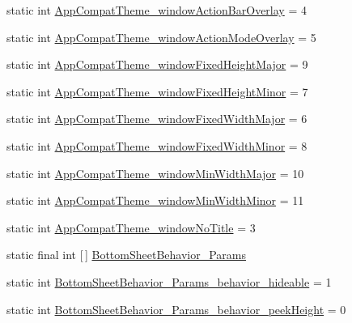 \begin{DoxyCompactItemize}
\item 
static int \hyperlink{classandroid_1_1support_1_1v7_1_1mediarouter_1_1R_1_1styleable_a3ed10a138c0c8928988e19b890aec7f7}{App\+Compat\+Theme\+\_\+window\+Action\+Bar\+Overlay} = 4
\item 
static int \hyperlink{classandroid_1_1support_1_1v7_1_1mediarouter_1_1R_1_1styleable_ae55a9de1cb75512d04d62f878dcfefc3}{App\+Compat\+Theme\+\_\+window\+Action\+Mode\+Overlay} = 5
\item 
static int \hyperlink{classandroid_1_1support_1_1v7_1_1mediarouter_1_1R_1_1styleable_a7f07a96e9dd77caa12d1744db19f037d}{App\+Compat\+Theme\+\_\+window\+Fixed\+Height\+Major} = 9
\item 
static int \hyperlink{classandroid_1_1support_1_1v7_1_1mediarouter_1_1R_1_1styleable_a9d793fbf38eeb7d1b8c2707b951dcf24}{App\+Compat\+Theme\+\_\+window\+Fixed\+Height\+Minor} = 7
\item 
static int \hyperlink{classandroid_1_1support_1_1v7_1_1mediarouter_1_1R_1_1styleable_a2a286949ebf9182579df1a88e8e294d0}{App\+Compat\+Theme\+\_\+window\+Fixed\+Width\+Major} = 6
\item 
static int \hyperlink{classandroid_1_1support_1_1v7_1_1mediarouter_1_1R_1_1styleable_a291edfbcc421e452ee7b5b1b806fdd68}{App\+Compat\+Theme\+\_\+window\+Fixed\+Width\+Minor} = 8
\item 
static int \hyperlink{classandroid_1_1support_1_1v7_1_1mediarouter_1_1R_1_1styleable_ac2a09f6509c071955e5978f37e5c4633}{App\+Compat\+Theme\+\_\+window\+Min\+Width\+Major} = 10
\item 
static int \hyperlink{classandroid_1_1support_1_1v7_1_1mediarouter_1_1R_1_1styleable_aa71bde585a9d55a3de254d2ece1c876d}{App\+Compat\+Theme\+\_\+window\+Min\+Width\+Minor} = 11
\item 
static int \hyperlink{classandroid_1_1support_1_1v7_1_1mediarouter_1_1R_1_1styleable_a26662431b0c47b968955d940dc4adc24}{App\+Compat\+Theme\+\_\+window\+No\+Title} = 3
\item 
static final int \mbox{[}$\,$\mbox{]} \hyperlink{classandroid_1_1support_1_1v7_1_1mediarouter_1_1R_1_1styleable_a79256b2584517e9cb65dff8f9bc2bb71}{Bottom\+Sheet\+Behavior\+\_\+\+Params}
\item 
static int \hyperlink{classandroid_1_1support_1_1v7_1_1mediarouter_1_1R_1_1styleable_ac16c268a6545ed510df667b1e0997bf7}{Bottom\+Sheet\+Behavior\+\_\+\+Params\+\_\+behavior\+\_\+hideable} = 1
\item 
static int \hyperlink{classandroid_1_1support_1_1v7_1_1mediarouter_1_1R_1_1styleable_a8c29b649bf80308e39a67a58955949e7}{Bottom\+Sheet\+Behavior\+\_\+\+Params\+\_\+behavior\+\_\+peek\+Height} = 0

\end{DoxyCompactItemize}
